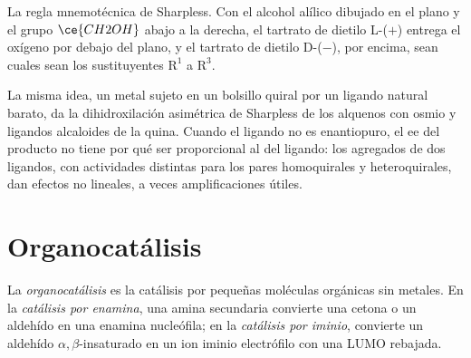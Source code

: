 \begin{omfigure}

{\small La regla mnemotécnica de Sharpless. Con el alcohol alílico dibujado en el plano y el
grupo $\ce{CH2OH}$ abajo a la derecha, el tartrato de dietilo L-($+$) entrega el oxígeno por
debajo del plano, y el tartrato de dietilo D-($-$), por encima, sean cuales sean los
sustituyentes $\mathrm R^1$ a $\mathrm R^3$.}
\end{omfigure}

La misma idea, un metal sujeto en un bolsillo quiral por un ligando natural barato, da la
dihidroxilación asimétrica de Sharpless de los alquenos con osmio y ligandos alcaloides de la
quina. Cuando el ligando no es enantiopuro, el ee del producto
no tiene por qué ser proporcional al del ligando: los agregados de dos ligandos, con
actividades distintas para los pares homoquirales y heteroquirales, dan efectos
no lineales, a veces amplificaciones útiles.

\section{Organocatálisis}

\begin{definition}[Organocatálisis]\label{def:b3:asymmetric-synthesis:organocatalysis}
La \emph{organocatálisis} es la catálisis por pequeñas moléculas
orgánicas sin metales. En la \emph{catálisis por enamina}, una
amina secundaria convierte una cetona o un aldehído en una enamina nucleófila; en la
\emph{catálisis por iminio}, convierte un aldehído $\alpha,\beta$-insaturado
en un ion iminio electrófilo con una LUMO rebajada.
\end{definition}


